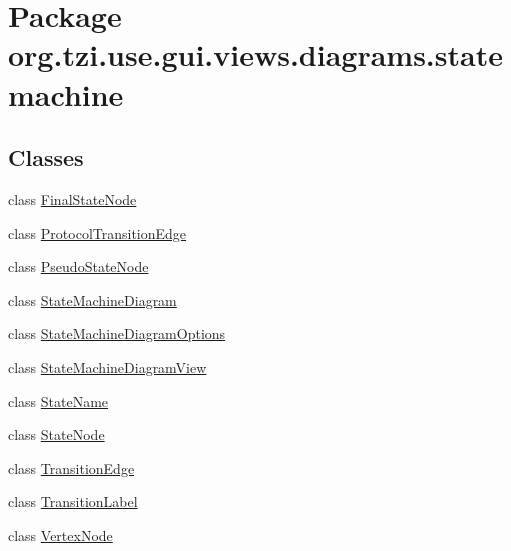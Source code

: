\hypertarget{namespaceorg_1_1tzi_1_1use_1_1gui_1_1views_1_1diagrams_1_1statemachine}{\section{Package org.\-tzi.\-use.\-gui.\-views.\-diagrams.\-statemachine}
\label{namespaceorg_1_1tzi_1_1use_1_1gui_1_1views_1_1diagrams_1_1statemachine}
}
\subsection*{Classes}
\begin{DoxyCompactItemize}
\item 
class \hyperlink{classorg_1_1tzi_1_1use_1_1gui_1_1views_1_1diagrams_1_1statemachine_1_1_final_state_node}{Final\-State\-Node}
\item 
class \hyperlink{classorg_1_1tzi_1_1use_1_1gui_1_1views_1_1diagrams_1_1statemachine_1_1_protocol_transition_edge}{Protocol\-Transition\-Edge}
\item 
class \hyperlink{classorg_1_1tzi_1_1use_1_1gui_1_1views_1_1diagrams_1_1statemachine_1_1_pseudo_state_node}{Pseudo\-State\-Node}
\item 
class \hyperlink{classorg_1_1tzi_1_1use_1_1gui_1_1views_1_1diagrams_1_1statemachine_1_1_state_machine_diagram}{State\-Machine\-Diagram}
\item 
class \hyperlink{classorg_1_1tzi_1_1use_1_1gui_1_1views_1_1diagrams_1_1statemachine_1_1_state_machine_diagram_options}{State\-Machine\-Diagram\-Options}
\item 
class \hyperlink{classorg_1_1tzi_1_1use_1_1gui_1_1views_1_1diagrams_1_1statemachine_1_1_state_machine_diagram_view}{State\-Machine\-Diagram\-View}
\item 
class \hyperlink{classorg_1_1tzi_1_1use_1_1gui_1_1views_1_1diagrams_1_1statemachine_1_1_state_name}{State\-Name}
\item 
class \hyperlink{classorg_1_1tzi_1_1use_1_1gui_1_1views_1_1diagrams_1_1statemachine_1_1_state_node}{State\-Node}
\item 
class \hyperlink{classorg_1_1tzi_1_1use_1_1gui_1_1views_1_1diagrams_1_1statemachine_1_1_transition_edge}{Transition\-Edge}
\item 
class \hyperlink{classorg_1_1tzi_1_1use_1_1gui_1_1views_1_1diagrams_1_1statemachine_1_1_transition_label}{Transition\-Label}
\item 
class \hyperlink{classorg_1_1tzi_1_1use_1_1gui_1_1views_1_1diagrams_1_1statemachine_1_1_vertex_node}{Vertex\-Node}
\end{DoxyCompactItemize}
